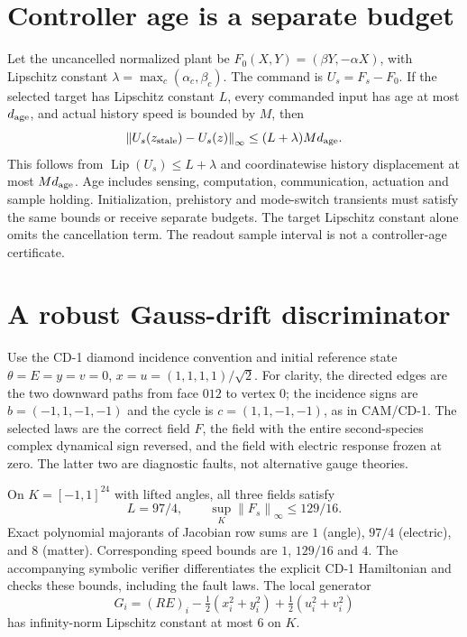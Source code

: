 \documentclass[10pt,a4paper]{article}
\newcommand{\norm}[1]{\left\|#1\right\|_\infty}
\begin{document}
\section{Controller age is a separate budget}
Let the uncancelled normalized plant be $F_0(X,Y)=(\beta Y,-\alpha X)$, with Lipschitz constant $\lambda=\max_c(\alpha_c,\beta_c)$. The command is $U_s=F_s-F_0$. If the selected target has Lipschitz constant $L$, every commanded input has age at most $d_{\rm age}$, and actual history speed is bounded by $M$, then
\begin{equation}
\norm{U_s(z_{\rm stale})-U_s(z)}
\leq(L+\lambda)M d_{\rm age}.
\end{equation}
This follows from $\operatorname{Lip}(U_s)\leq L+\lambda$ and coordinatewise history displacement at most $M d_{\rm age}$. Age includes sensing, computation, communication, actuation and sample holding. Initialization, prehistory and mode-switch transients must satisfy the same bounds or receive separate budgets. The target Lipschitz constant alone omits the cancellation term. The readout sample interval is not a controller-age certificate.
\newpage
\section{A robust Gauss-drift discriminator}
Use the CD-1 diamond incidence convention and initial reference state
$\theta=E=y=v=0$, $x=u=(1,1,1,1)/\sqrt2$.
For clarity, the directed edges are the two downward paths from face $012$ to vertex $0$; the incidence signs are $b=(-1,1,-1,-1)$ and the cycle is $c=(1,1,-1,-1)$, as in CAM/CD-1.
The selected laws are the correct field $F$, the field with the entire second-species complex dynamical sign reversed, and the field with electric response frozen at zero. The latter two are diagnostic faults, not alternative gauge theories.

On $K=[-1,1]^{24}$ with lifted angles, all three fields satisfy
\begin{equation}
L=97/4,\qquad \sup_K\norm{F_s}\leq129/16.
\end{equation}
Exact polynomial majorants of Jacobian row sums are $1$ (angle), $97/4$ (electric), and $8$ (matter). Corresponding speed bounds are $1$, $129/16$ and $4$. The accompanying symbolic verifier differentiates the explicit CD-1 Hamiltonian and checks these bounds, including the fault laws.
The local generator
\begin{equation}
G_i=(RE)_i-\tfrac12(x_i^2+y_i^2)+\tfrac12(u_i^2+v_i^2)
\end{equation}
has infinity-norm Lipschitz constant at most $6$ on $K$.
\end{document}
